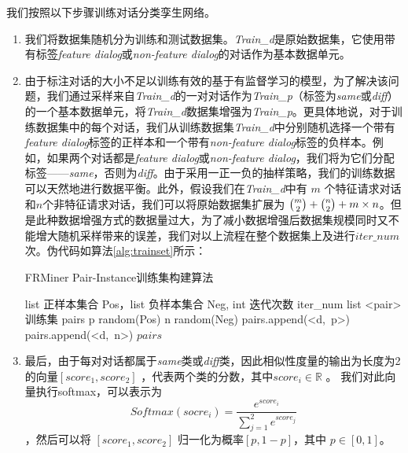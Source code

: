 我们按照以下步骤训练对话分类孪生网络。
\begin{enumerate}
    \item 我们将数据集随机分为训练和测试数据集。\textit{Train\_d}是原始数据集，它使用带有标签\textit{feature dialog}或\textit{non-feature dialog}的对话作为基本数据单元。
    \item 由于标注对话的大小不足以训练有效的基于有监督学习的模型，为了解决该问题，我们通过采样来自\textit{Train\_d}的一对对话作为\textit{Train\_p}（标签为\textit{same}或\textit{diff}）的一个基本数据单元，将\textit{Train\_d}数据集增强为\textit{Train\_p}。更具体地说，对于训练数据集中的每个对话，我们从训练数据集\textit{Train\_d}中分别随机选择一个带有\textit{feature dialog}标签的正样本和一个带有\textit{non-feature dialog}标签的负样本。例如，如果两个对话都是\textit{feature dialog}或\textit{non-feature dialog}，我们将为它们分配标签——\textit{same}，否则为\textit{diff}。由于采用一正一负的抽样策略，我们的训练数据可以天然地进行数据平衡。此外，假设我们在\textit{Train\_d}中有 $m$ 个特征请求对话和$n$个非特征请求对话，我们可以将原始数据集扩展为 $\tbinom{m}{2}+\tbinom{n}{2}+m\times n$。但是此种数据增强方式的数据量过大，为了减小数据增强后数据集规模同时又不能增大随机采样带来的误差，我们对以上流程在整个数据集上及进行$iter\_num$次。伪代码如算法\ref{alg:trainset}所示：
    \begin{algorithm}[htb]
            \caption{FRMiner Pair-Instance训练集构建算法}  
            \label{alg:trainset}
            \begin{algorithmic}[1]
                \Require list 正样本集合 Pos，list 负样本集合 Neg, int 迭代次数 iter\_num 
                \Ensure list <pair> 训练集 
                    \State pairs \gets [\ ]
                            \State p \gets random(Pos)
                            \State n \gets random(Neg)
                            \State pairs.append(<d,\ p>)
                            \State pairs.append(<d,\ n>)
                        \EndFor
                    \EndFor
                    \State \Return $pairs$
                \EndFunction  
            \end{algorithmic}  
    \end{algorithm}
    \item 最后，由于每对对话都属于\textit{same}类或\textit{diff}类，因此相似性度量的输出为长度为2的向量$[score_1 , score_2]$  ，代表两个类的分数，其中$score_i \in \mathbb{R}$ 。 我们对此向量执行softmax，可以表示为
    $$Softmax(socre_i)=\frac{e^{score_i}}{\sum_{j=1}^2 e^{score_j}}$$ 
    ，然后可以将 $[score_1 , score_2]$ 归一化为概率$[p ,1-p]$，其中 $p \in [0,1]$。
\end{enumerate}
